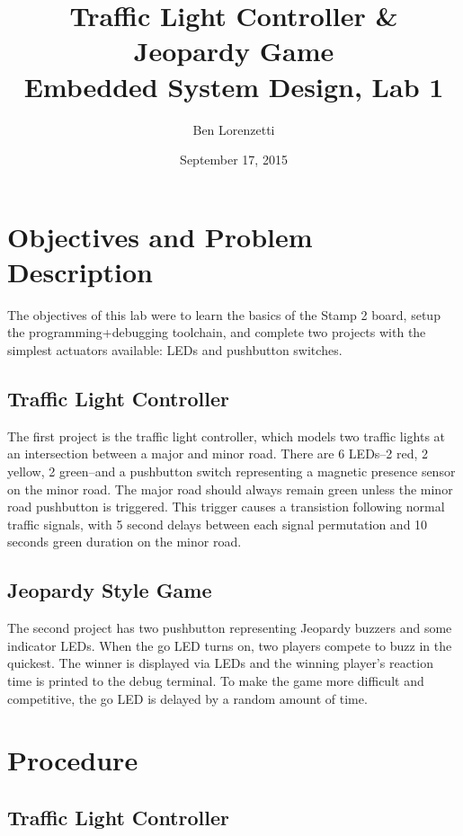 \documentclass[11pt]{article}
\begin{document}
\title{Traffic Light Controller \& Jeopardy Game\\Embedded System Design, Lab 1}
\date{September 17, 2015}
\author{Ben Lorenzetti}
\maketitle
\tableofcontents

\section{Objectives and Problem Description}

The objectives of this lab were to learn the basics of the Stamp 2 board, setup the programming+debugging toolchain, and complete two projects with the simplest actuators available: LEDs and pushbutton switches.

\subsection{Traffic Light Controller}

The first project is the traffic light controller, which models two traffic lights at an intersection between a major and minor road. There are 6 LEDs--2 red, 2 yellow, 2 green--and a pushbutton switch representing a magnetic presence sensor on the minor road. The major road should always remain green unless the minor road pushbutton is triggered. This trigger causes a transistion following normal traffic signals, with 5 second delays between each signal permutation and 10 seconds green duration on the minor road.

\subsection{Jeopardy Style Game}

The second project has two pushbutton representing Jeopardy buzzers and some indicator LEDs.
When the go LED turns on, two players compete to buzz in the quickest.
The winner is displayed via LEDs and the winning player's reaction time is printed to the debug terminal.
To make the game more difficult and competitive, the go LED is delayed by a random amount of time.

\section{Procedure}

\subsection{Traffic Light Controller}
\end{document}
